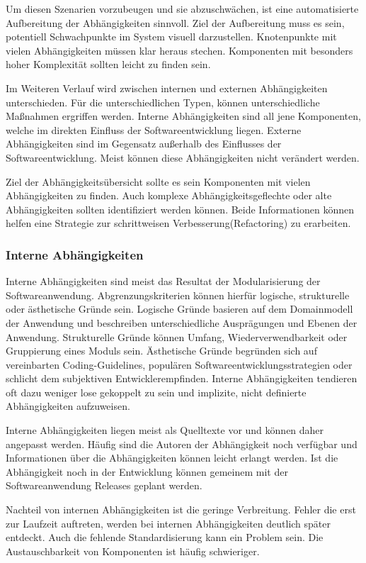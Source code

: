 Um diesen Szenarien vorzubeugen und sie abzuschwächen, ist eine automatisierte Aufbereitung der Abhängigkeiten sinnvoll. Ziel der Aufbereitung muss es sein, potentiell Schwachpunkte im System visuell darzustellen. Knotenpunkte mit vielen Abhängigkeiten müssen klar heraus stechen. Komponenten mit besonders hoher Komplexität sollten leicht zu finden sein.

Im Weiteren Verlauf wird zwischen internen und externen Abhängigkeiten unterschieden. Für die unterschiedlichen Typen, können unterschiedliche Maßnahmen ergriffen werden. Interne Abhängigkeiten sind all jene Komponenten, welche im direkten Einfluss der Softwareentwicklung liegen. Externe Abhängigkeiten sind im Gegensatz außerhalb des Einflusses der Softwareentwicklung. Meist können diese Abhängigkeiten nicht verändert werden.

Ziel der Abhängigkeitsübersicht sollte es sein Komponenten mit vielen Abhängigkeiten zu finden. Auch komplexe Abhängigkeitsgeflechte oder alte Abhängigkeiten sollten identifiziert werden können. Beide Informationen können helfen eine Strategie zur schrittweisen Verbesserung(\gls{Refactoring}) zu erarbeiten.

\subsubsection{Interne Abhängigkeiten}

Interne Abhängigkeiten sind meist das Resultat der Modularisierung der Softwareanwendung. Abgrenzungskriterien können hierfür logische, strukturelle oder ästhetische Gründe sein. Logische Gründe basieren auf dem Domainmodell der Anwendung und beschreiben unterschiedliche Ausprägungen und Ebenen der Anwendung. Strukturelle Gründe können Umfang, Wiederverwendbarkeit oder Gruppierung eines Moduls sein. Ästhetische Gründe begründen sich auf vereinbarten Coding-Guidelines, populären Softwareentwicklungsstrategien oder schlicht dem subjektiven Entwicklerempfinden. Interne Abhängigkeiten tendieren oft dazu weniger lose gekoppelt zu sein und implizite, nicht definierte Abhängigkeiten aufzuweisen.

Interne Abhängigkeiten liegen meist als Quelltexte vor und können daher angepasst werden. Häufig sind die Autoren der Abhängigkeit noch verfügbar und Informationen über die Abhängigkeiten können leicht erlangt werden.
Ist die Abhängigkeit noch in der Entwicklung können gemeinem mit der Softwareanwendung Releases geplant werden. 

Nachteil von internen Abhängigkeiten ist die geringe Verbreitung. Fehler die erst zur Laufzeit auftreten, werden bei internen Abhängigkeiten deutlich später entdeckt. Auch die fehlende Standardisierung kann ein Problem sein. Die Austauschbarkeit von Komponenten ist häufig schwieriger.

